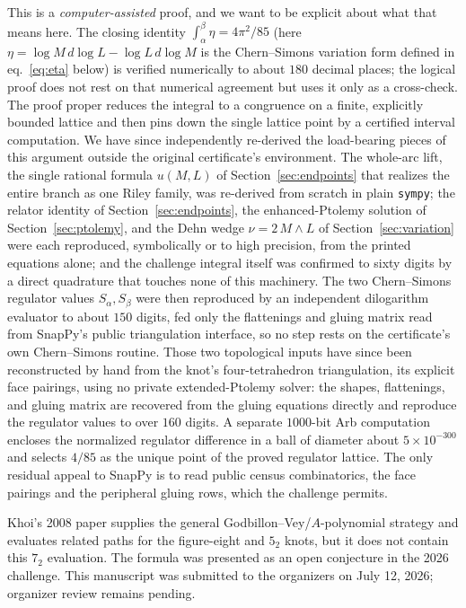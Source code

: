 \documentclass[11pt]{article}
\theoremstyle{definition}
\begin{document}
This is a \emph{computer-assisted} proof, and we want to be explicit about what
that means here.  The closing identity $\int_\alpha^\beta\eta=4\pi^2/85$ (here
$\eta=\log M\,d\log L-\log L\,d\log M$ is the Chern--Simons variation form
defined in eq.~\eqref{eq:eta} below) is
verified numerically to about $180$ decimal places; the logical proof does not
rest on that numerical agreement but uses it only as a cross-check.  The proof
proper reduces the integral to a congruence on a finite, explicitly bounded
lattice and then pins down the single lattice point by a certified
interval computation.  We have since independently re-derived the load-bearing pieces of this argument
outside the original certificate's environment.  The whole-arc lift, the single
rational formula $u(M,L)$ of Section~\ref{sec:endpoints} that realizes the entire
branch as one Riley family, was re-derived from scratch in plain \texttt{sympy};
the relator identity of Section~\ref{sec:endpoints}, the enhanced-Ptolemy solution
of Section~\ref{sec:ptolemy}, and the Dehn wedge $\nu=2\,M\wedge L$ of
Section~\ref{sec:variation} were each reproduced, symbolically or to high
precision, from the printed equations alone; and the challenge integral itself was
confirmed to sixty digits by a direct quadrature that touches none of this
machinery.  The two Chern--Simons regulator values $S_\alpha,S_\beta$ were then
reproduced by an independent dilogarithm evaluator to about $150$ digits, fed only
the flattenings and gluing matrix read from SnapPy's public triangulation
interface, so no step rests on the certificate's own Chern--Simons routine.  Those two
topological inputs have since been reconstructed by hand from the knot's
four-tetrahedron triangulation, its explicit face pairings, using no private
extended-Ptolemy solver: the shapes, flattenings, and gluing matrix are recovered
from the gluing equations directly and reproduce the regulator values to over
$160$ digits.  A separate $1000$-bit Arb computation encloses the normalized
regulator difference in a ball of diameter about $5\times10^{-300}$ and selects
$4/85$ as the unique point of the proved regulator lattice.  The only residual
appeal to SnapPy is to read public census combinatorics, the face pairings and
the peripheral gluing rows, which the challenge permits.

Khoi's 2008 paper supplies the general Godbillon--Vey/$A$-polynomial strategy
and evaluates related paths for the figure-eight and $5_2$ knots, but it does
not contain this $7_2$ evaluation.  The formula was presented as an open
conjecture in the 2026 challenge.  This manuscript was submitted to the
organizers on July 12, 2026; organizer review remains pending.
\end{document}

